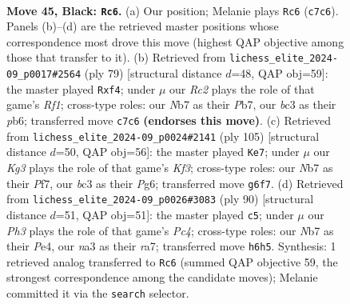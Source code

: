 \documentclass[11pt]{article}
\begin{document}
\clearpage

\begin{figure}[p]\centering
\begin{subfigure}{0.46\textwidth}\centering
\resizebox{\linewidth}{!}{%
\newchessgame
\chessboard[
  setfen={r7/pnr5/1p2p1kp/5p2/2P4R/N1B1P3/P4PP1/2R2K2 b - - 5 45},
  showmover=false,
  pgfstyle=straightmove, color=movearrow, markmove={c7-c6}
]}
\caption{}
\end{subfigure}\hfill
\begin{subfigure}{0.46\textwidth}\centering
\resizebox{\linewidth}{!}{%
\newchessgame
\chessboard[
  setfen={5r2/1p1r2pk/1Pp1p2p/8/3P1PNP/3R1P2/1R6/7K b - - 2 40},
  showmover=false,
  pgfstyle=straightmove, color=movearrow, markmove={f8-f4}
]}
\caption{}
\end{subfigure}
\\[4pt]
\begin{subfigure}{0.46\textwidth}\centering
\resizebox{\linewidth}{!}{%
\newchessgame
\chessboard[
  setfen={8/3r1p2/5kp1/8/1n1P3p/pP5P/P2RB1PK/8 b - - 4 53},
  showmover=false,
  pgfstyle=straightmove, color=movearrow, markmove={f6-e7}
]}
\caption{}
\end{subfigure}\hfill
\begin{subfigure}{0.46\textwidth}\centering
\resizebox{\linewidth}{!}{%
\newchessgame
\chessboard[
  setfen={8/r5kp/2r3p1/1R2p1P1/p1P1P3/5PP1/R5K1/8 w - - 3 46},
  showmover=false,
  pgfstyle=straightmove, color=movearrow, markmove={c4-c5}
]}
\caption{}
\end{subfigure}
\caption{\textbf{Move 45, Black: \texttt{Rc6}.} (a) Our position; Melanie plays \texttt{Rc6} (\texttt{c7c6}). Panels (b)--(d) are the retrieved master positions whose correspondence most drove this move (highest QAP objective among those that transfer to it). (b) Retrieved from \texttt{lichess\_elite\_2024-09\_p0017\#2564} (ply 79) [structural distance $d$=48, QAP obj=59]: the master played \texttt{Rxf4}; under $\mu$ our \emph{Rc2} plays the role of that game's \emph{Rf1}; cross-type roles: our \emph{N}b7 as their \emph{P}b7, our \emph{b}c3 as their \emph{p}b6; transferred move \texttt{c7c6} \textbf{(endorses this move)}. (c) Retrieved from \texttt{lichess\_elite\_2024-09\_p0024\#2141} (ply 105) [structural distance $d$=50, QAP obj=56]: the master played \texttt{Ke7}; under $\mu$ our \emph{Kg3} plays the role of that game's \emph{Kf3}; cross-type roles: our \emph{N}b7 as their \emph{P}f7, our \emph{b}c3 as their \emph{P}g6; transferred move \texttt{g6f7}. (d) Retrieved from \texttt{lichess\_elite\_2024-09\_p0026\#3083} (ply 90) [structural distance $d$=51, QAP obj=51]: the master played \texttt{c5}; under $\mu$ our \emph{Ph3} plays the role of that game's \emph{Pc4}; cross-type roles: our \emph{N}b7 as their \emph{P}e4, our \emph{n}a3 as their \emph{r}a7; transferred move \texttt{h6h5}. Synthesis: 1 retrieved analog transferred to \texttt{Rc6} (summed QAP objective 59, the strongest correspondence among the candidate moves); Melanie committed it via the \texttt{search} selector.}
\label{fig:thought-m89}
\end{figure}
\end{document}
